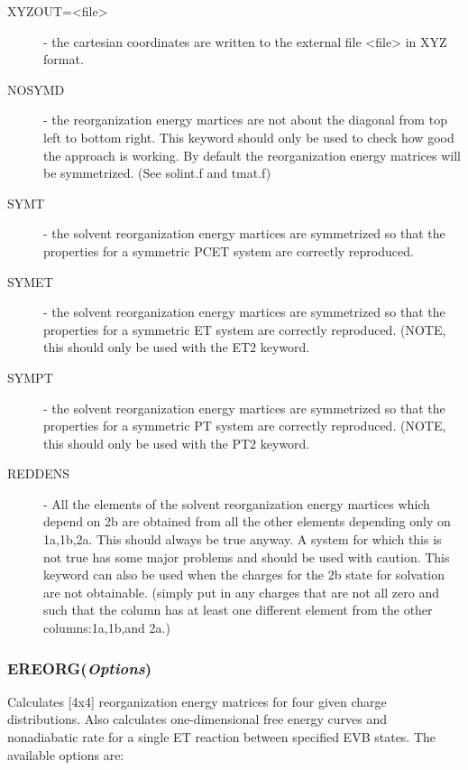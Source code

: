 \documentclass[oneside,11pt,openany]{book}
\newcommand{\tw}{\ttfamily}
\begin{document}
\begin{description}
\item[{\tw XYZOUT=<file>}] - the cartesian coordinates
are written to the external file {\tw <file>} in XYZ format.
\item[{\tw NOSYMD}] - the reorganization energy martices are not 
about the diagonal from top left to bottom right.  This keyword
should only be used to check how good the approach is working.  By 
default the reorganization energy matrices will be symmetrized.
(See solint.f and tmat.f)
\item[{\tw SYMT}] - the solvent reorganization energy martices are
symmetrized so that the properties for a symmetric PCET system are
correctly reproduced.
\item[{\tw SYMET}] - the solvent reorganization energy martices are
symmetrized so that the properties for a symmetric ET system are
correctly reproduced. (NOTE, this should only be used with the ET2
keyword.
\item[{\tw SYMPT}] - the solvent reorganization energy martices are
symmetrized so that the properties for a symmetric PT system are
correctly reproduced. (NOTE, this should only be used with the PT2
keyword.             
\item[{\tw REDDENS}] - All the elements of the solvent reorganization
energy martices which depend on 2b are obtained from all the other
elements depending only on 1a,1b,2a.  This should always be true anyway.  
A system for which this is not true has some major problems and should
be used with caution. This keyword can also be used when the
charges for the 2b state for solvation are not obtainable.  (simply
put in any charges that are not all zero 
and such that the column has at least 
one different element from the other columns:1a,1b,and 2a.)
\end{description}

\subsubsection*{EREORG({\it Options})}
%
Calculates [4x4] reorganization energy matrices for four given
charge distributions. Also calculates one-dimensional free energy curves
and nonadiabatic rate for a single ET reaction between specified EVB states.
The available options are:
\end{document}
